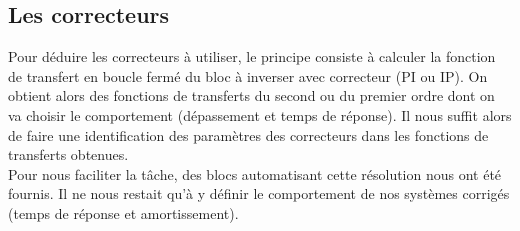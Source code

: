 \subsection{Les correcteurs}
Pour déduire les correcteurs à utiliser, le principe consiste à calculer la fonction de transfert en boucle fermé du bloc à inverser avec correcteur (PI ou IP). On obtient alors des fonctions de transferts du second ou du premier ordre dont on va choisir le comportement (dépassement et temps de réponse). Il nous suffit alors de faire une identification des paramètres des correcteurs dans les fonctions de transferts obtenues.\\
Pour nous faciliter la tâche, des blocs automatisant cette résolution nous ont été fournis. Il ne nous restait qu'à y définir le comportement de nos systèmes corrigés (temps de réponse et amortissement).\\